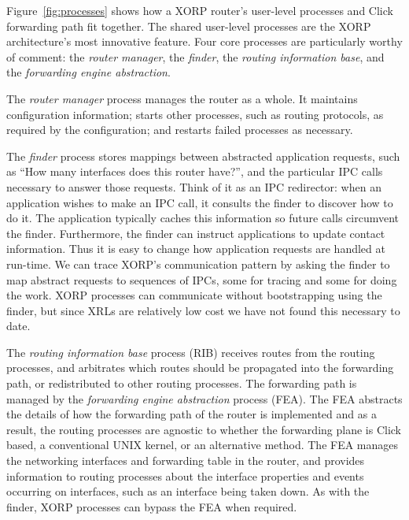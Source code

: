 Figure~\ref{fig:processes} shows how a XORP router's user-level processes
and Click forwarding path fit together.
The shared user-level processes are the XORP architecture's most innovative
feature. Four core processes are particularly worthy of comment: the
\emph{router manager},
the \emph{finder}, the \emph{routing information base}, and the 
\emph{forwarding engine abstraction}.  

The \emph{router manager}
process manages the router as a whole.  It maintains
configuration information; starts other processes, such as routing
protocols, as required by the configuration; and restarts failed
processes as necessary.

The \emph{finder} process stores mappings between abstracted application
requests, such as ``How many interfaces does this router have?'', and the
particular IPC calls necessary to answer those requests.
Think of it as an IPC redirector:
when an application wishes to make an IPC
call, it consults the finder to discover how to do it.  The
application typically caches this information so future calls
circumvent the finder.  Furthermore, the finder can instruct
applications to update contact information.  Thus it is easy to change
how application requests are handled at run-time.  We
can trace XORP's communication pattern by asking the finder to map
abstract requests to sequences of IPCs, some for tracing and some for
doing the work.  XORP processes can communicate without
bootstrapping using the finder, but since XRLs are relatively low cost we
have not found this necessary to date.



The \emph{routing information base} process (RIB) receives routes from
the routing processes, and arbitrates which routes should be
propagated into the forwarding path, or redistributed to other routing
processes.  The forwarding path is managed
by the \emph{forwarding engine abstraction} process (FEA).  The FEA
abstracts the details of how the forwarding path of the router is
implemented and as a result, the routing processes are agnostic to
whether the forwarding plane is Click based, a conventional UNIX
kernel, or an alternative method.  The FEA manages the networking
interfaces and forwarding table in the router, and provides information to routing processes
about the interface properties and events occurring on interfaces, such as an
interface being taken down.  As with the finder, XORP processes can bypass the
FEA when required.


